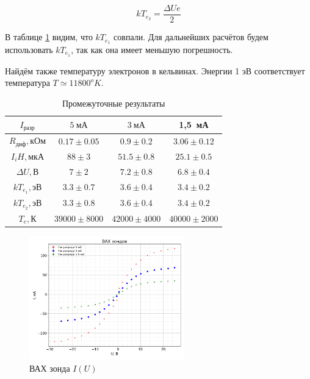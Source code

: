 \documentclass[a4paper, 12pt]{article}
\begin{document}
            $$
                kT_{e_2} = \frac{\Delta U e}{2}
            $$

            В таблице \ref{tab:res} видим, что $kT_{e_1}$ совпали. Для дальнейших расчётов будем использовать $kT_{e_1}$, так как она имеет меньшую погрешность.

            Найдём также температуру электронов в кельвинах. Энергии 1 эВ соответствует температура $T \simeq 11800^oK$.

            \begin{table}[!ht]
                \centering
                \begin{tabular}{|c|c|c|c|}
                    \hline

                    $I_{разр}$ & $5~мА$ & $3~мА$ & 1,5~мА\\ \hline
                    $R_{диф}, кОм$ & $0.17 \pm 0.05$ & $0.9 \pm 0.2$ & $3.06 \pm 0.12$\\ \hline
                    $I_iH, мкА$ & $88 \pm 3$ & $51.5 \pm 0.8$ & $25.1 \pm 0.5$\\ \hline
                    $\Delta U, В$ & $7 \pm 2$ & $7.2 \pm 0.8$ & $6.8 \pm 0.4$\\ \hline
                    $kT_{e_1}, эВ$ & $3.3 \pm 0.7$ & $3.6 \pm 0.4$ & $3.4 \pm 0.2$\\ \hline
                    $kT_{e_2}, эВ$ & $3.3 \pm 0.8$ & $3.6 \pm 0.4$ & $3.4 \pm 0.2$\\ \hline
                    $T_e, К$ & $39000 \pm 8000$ & $42000 \pm 4000$ & $40000 \pm 2000$\\ \hline

                \end{tabular}
                \caption{Промежуточные результаты}
                \label{tab:res}
            \end{table}

            \begin{figure}[!ht]
                \centering
                \includegraphics[width=0.6\textwidth]{img/vah_zond.png}
                \caption{ВАХ зонда $I(U)$}
                \label{plot:vah_zond}
            \end{figure}
\end{document}
